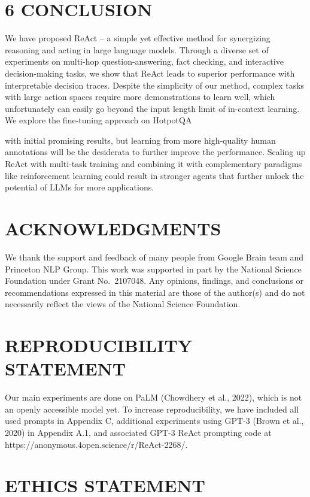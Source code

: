 \documentclass[
]{article}
\begin{document}
\section{6 CONCLUSION}\label{conclusion}

We have proposed ReAct -- a simple yet effective method for synergizing
reasoning and acting in large language models. Through a diverse set of
experiments on multi-hop question-answering, fact checking, and
interactive decision-making tasks, we show that ReAct leads to superior
performance with interpretable decision traces. Despite the simplicity
of our method, complex tasks with large action spaces require more
demonstrations to learn well, which unfortunately can easily go beyond
the input length limit of in-context learning. We explore the
fine-tuning approach on HotpotQA

with initial promising results, but learning from more high-quality
human annotations will be the desiderata to further improve the
performance. Scaling up ReAct with multi-task training and combining it
with complementary paradigms like reinforcement learning could result in
stronger agents that further unlock the potential of LLMs for more
applications.

\section{ACKNOWLEDGMENTS}\label{acknowledgments}

We thank the support and feedback of many people from Google Brain team
and Princeton NLP Group. This work was supported in part by the National
Science Foundation under Grant No.~2107048. Any opinions, findings, and
conclusions or recommendations expressed in this material are those of
the author(s) and do not necessarily reflect the views of the National
Science Foundation.

\section{REPRODUCIBILITY STATEMENT}\label{reproducibility-statement}

Our main experiments are done on PaLM (Chowdhery et al., 2022), which is
not an openly accessible model yet. To increase reproducibility, we have
included all used prompts in Appendix C, additional experiments using
GPT-3 (Brown et al., 2020) in Appendix A.1, and associated GPT-3 ReAct
prompting code at https://anonymous.4open.science/r/ReAct-2268/.

\section{ETHICS STATEMENT}\label{ethics-statement}
\end{document}
